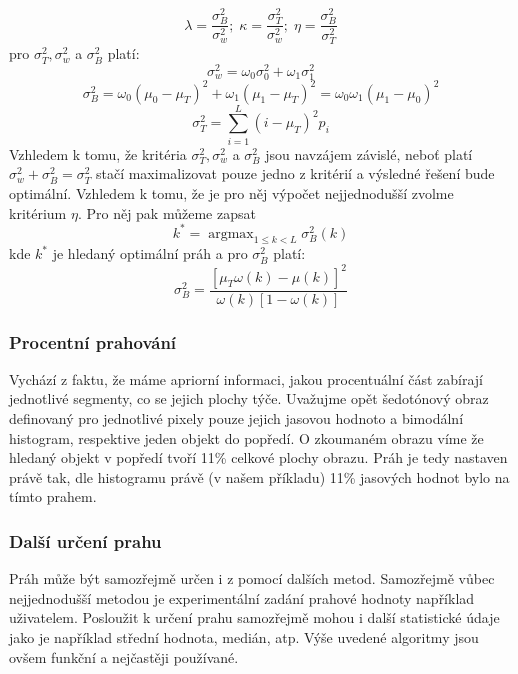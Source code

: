 \documentclass{thesis}%
\DeclareMathOperator*{\argmax}{argmax}
\begin{document}
\begin{equation}
\lambda = \frac{\sigma_B^2}{\sigma_w^2}; \; \kappa = \frac{\sigma_T^2}{\sigma_w^2}; \; \eta= \frac{\sigma_B^2}{\sigma_T^2}
\end{equation}
pro $\sigma_T^2, \sigma_w^2$ a $\sigma_B^2$ platí:
\begin{equation}
\sigma_w^2 = \omega_0\sigma_0^2 + \omega_1\sigma_1^2
\end{equation}
\begin{equation}
\sigma_B^2 = \omega_0(\mu_0-\mu_T)^2+\omega_1(\mu_1-\mu_T)^2=\omega_0\omega_1(\mu_1-\mu_0)^2
\end{equation}
\begin{equation}
\sigma_T^2 = \sum\limits_{i=1}^L (i-\mu_T)^2p_i
\end{equation}
Vzhledem k tomu, že kritéria $\sigma_T^2, \sigma_w^2$ a $\sigma_B^2$ jsou navzájem závislé, neboť platí $\sigma_w^2+\sigma_B^2=\sigma_T^2$ stačí maximalizovat pouze jedno z kritérií a výsledné řešení bude optimální. Vzhledem k tomu, že je pro něj výpočet nejjednodušší zvolme kritérium $\eta$. Pro něj pak můžeme zapsat
\begin{equation}
k^* = \argmax_{1\leq k<L}\sigma_B^2(k)
\end{equation}
kde $k^*$ je hledaný optimální práh a pro $\sigma_B^2$ platí:
\begin{equation}
\sigma_B^2 = \frac{[\mu_T\omega(k)-\mu(k)]^2}{\omega(k)[1-\omega(k)]}
\end{equation}
 \subsubsection{Procentní prahování}
 Vychází z faktu, že máme apriorní informaci, jakou procentuální část zabírají jednotlivé segmenty, co se jejich plochy týče. Uvažujme opět šedotónový obraz definovaný pro jednotlivé pixely pouze jejich jasovou hodnoto a bimodální histogram, respektive jeden objekt do popředí. O zkoumaném obrazu víme že hledaný objekt v popředí tvoří 11\% celkové plochy obrazu. Práh je tedy nastaven právě tak, dle histogramu právě (v našem příkladu) 11\% jasových hodnot bylo na tímto prahem.
 \subsubsection{Další určení prahu}
 Práh může být samozřejmě určen i z pomocí dalších metod. Samozřejmě vůbec nejjednodušší metodou je experimentální zadání prahové hodnoty například uživatelem. Posloužit k určení prahu samozřejmě mohou i další statistické údaje jako je například střední hodnota, medián, atp. Výše uvedené algoritmy jsou ovšem funkční a nejčastěji používané.
\end{document}
